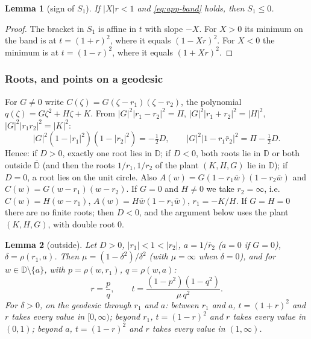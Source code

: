 \documentclass[11pt,reqno]{amsart}
\theoremstyle{plain}
\newtheorem*{lemma}{Lemma}
\theoremstyle{definition}
\theoremstyle{remark}
\begin{document}
\begin{lemma}[sign of $S_1$]
If $|X|r<1$ and \eqref{eq:app-band} holds, then $S_1\le0$.
\end{lemma}

\begin{proof}
The bracket in $S_1$ is affine in $t$ with slope $-X$. For $X>0$ its minimum on the band is at
$t=(1+r)^{2}$, where it equals $(1-Xr)^{2}$. For $X<0$ the minimum is at $t=(1-r)^{2}$, where it equals
$(1+Xr)^{2}$.
\end{proof}

\subsubsection{Roots, and points on a geodesic}\label{app:roots}

For $G\ne0$ write $C(\zeta)=G(\zeta-r_1)(\zeta-r_2)$, the polynomial $q(\zeta)=G\zeta^{2}+H\zeta+K$. From
$|G|^{2}|r_1-r_2|^{2}=\Pi$, $|G|^{2}|r_1+r_2|^{2}=|H|^{2}$, $|G|^{2}|r_1r_2|^{2}=|K|^{2}$:
\begin{equation}\label{eq:app-roots}
  |G|^{2}(1-|r_1|^{2})(1-|r_2|^{2})=-\tfrac12D,\qquad |G|^{2}|1-r_1\bar r_2|^{2}=\Pi-\tfrac12D .
\end{equation}
Hence: if $D>0$, exactly one root lies in $\mathbb D$; if $D<0$, both roots lie in $\mathbb D$ or both
outside $\overline{\mathbb D}$ (and then the roots $1/r_1,1/r_2$ of the plant $(K,H,G)$ lie in $\mathbb D$); if
$D=0$, a root lies on the unit circle. Also $A(w)=G(1-r_1\bar w)(1-r_2\bar w)$ and $C(w)=G(w-r_1)(w-r_2)$.
If $G=0$ and $H\ne0$ we take $r_2=\infty$, i.e.\ $C(w)=H(w-r_1)$, $A(w)=H\bar w(1-r_1\bar w)$, $r_1=-K/H$. If $G=H=0$ there are no finite roots; then $D<0$, and the argument below uses the plant $(K,H,G)$, with double root $0$.

\begin{lemma}[outside]
Let $D>0$, $|r_1|<1<|r_2|$, $a=1/\bar r_2$ ($a=0$ if $G=0$), $\delta=\rho(r_1,a)$. Then
$\mu=(1-\delta^{2})/\delta^{2}$ (with $\mu=\infty$ when $\delta=0$), and for $w\in\mathbb D\setminus\{a\}$, with
$p=\rho(w,r_1)$, $q=\rho(w,a)$:
\[
  r=\frac pq,\qquad t=\frac{(1-p^{2})(1-q^{2})}{\mu\,q^{2}} .
\]
For $\delta>0$, on the geodesic through $r_1$ and $a$: between $r_1$ and $a$, $t=(1+r)^{2}$ and $r$ takes every value
in $[0,\infty)$; beyond $r_1$, $t=(1-r)^{2}$ and $r$ takes every value in $(0,1)$; beyond $a$,
$t=(1-r)^{2}$ and $r$ takes every value in $(1,\infty)$.
\end{lemma}
\end{document}
